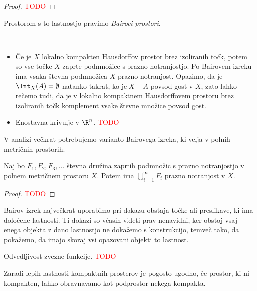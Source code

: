 \begin{proof}
    \textcolor{red}{TODO}
\end{proof}

\begin{definicija}
    Prostorom s to lastnostjo pravimo \emph{Bairovi prostori}.
\end{definicija}

\begin{primer}
    \
    \begin{itemize}
        \item Če je $X$ lokalno kompakten Hausdorffov prostor brez izoliranih točk, potem so vse točke $X$ zaprte podmnožice s prazno notranjostjo. Po Bairovem izreku ima vsaka števna podmnožica $X$ prazno notranjost. Opazimo, da je $\Int_X(A) = \emptyset$ natanko takrat, ko je $X - A$ povsod gost v $X$, zato lahko rečemo tudi, da je v lokalno kompaktnem Hausdorffovem prostoru brez izoliranih točk komplement vsake števne množice povsod gost.
        \item Enostavna krivulje v \(\R^n\). \textcolor{red}{TODO}
    \end{itemize}
\end{primer}

V analizi večkrat potrebujemo varianto Bairovega izreka, ki velja v polnih metričnih prostorih.

\begin{izrek}
    Naj bo $F_1, F_2, F_3, \ldots$ števna družina zaprtih podmnožic s prazno notranjostjo v polnem metričnem prostoru $X$. Potem ima $\bigcup_{i=1}^\infty F_i$ prazno notranjost v $X$. 
\end{izrek}

\begin{proof}
    \textcolor{red}{TODO}
\end{proof}

Bairov izrek največkrat uporabimo pri dokazu obstaja točke ali preslikave, ki ima določene lastnosti. Ti dokazi so včasih videti prav nenavidni, ker obstoj vsaj enega objekta z dano lastnostjo ne dokažemo s konstrukcijo, temveč tako, da pokažemo, da imajo skoraj vsi opazovani objekti to lastnost.

\begin{primer}
    Odvedljivost zvezne funkcije. \textcolor{red}{TODO}
\end{primer}

Zaradi lepih lastnosti kompaktnih prostorov je pogosto ugodno, če prostor, ki ni kompakten, lahko obravnavamo kot podprostor nekega kompakta.

